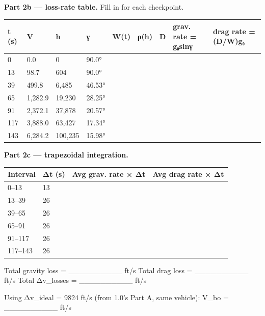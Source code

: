 \documentclass[
  10pt,
]{article}
\begin{document}
\textbf{Part 2b --- loss-rate table.} Fill in for each checkpoint.

\begin{longtable}[]{@{}lllllllll@{}}
\toprule
t (s) & V & h & γ & W(t) & ρ(h) & D & grav. rate = g₀sinγ & drag rate =
(D/W)g₀\tabularnewline
\midrule
\endhead
0 & 0.0 & 0 & 90.0° & & & & &\tabularnewline
13 & 98.7 & 604 & 90.0° & & & & &\tabularnewline
39 & 499.8 & 6,485 & 46.53° & & & & &\tabularnewline
65 & 1,282.9 & 19,230 & 28.25° & & & & &\tabularnewline
91 & 2,372.1 & 37,878 & 20.57° & & & & &\tabularnewline
117 & 3,888.0 & 63,427 & 17.34° & & & & &\tabularnewline
143 & 6,284.2 & 100,235 & 15.98° & & & & &\tabularnewline
\bottomrule
\end{longtable}

\textbf{Part 2c --- trapezoidal integration.}

\begin{longtable}[]{@{}llll@{}}
\toprule
Interval & Δt (s) & Avg grav. rate × Δt & Avg drag rate ×
Δt\tabularnewline
\midrule
\endhead
0--13 & 13 & &\tabularnewline
13--39 & 26 & &\tabularnewline
39--65 & 26 & &\tabularnewline
65--91 & 26 & &\tabularnewline
91--117 & 26 & &\tabularnewline
117--143 & 26 & &\tabularnewline
\bottomrule
\end{longtable}

Total gravity loss = \_\_\_\_\_\_\_\_\_\_ ft/s Total drag loss =
\_\_\_\_\_\_\_\_\_\_ ft/s Total Δv\_losses = \_\_\_\_\_\_\_\_\_\_ ft/s

Using Δv\_ideal = 9824 ft/s (from 1.0's Part A, same vehicle): V\_bo =
\_\_\_\_\_\_\_\_\_\_ ft/s
\end{document}
